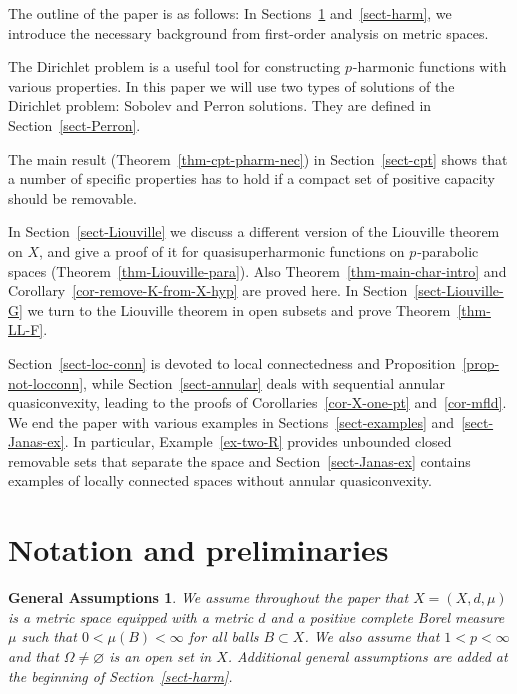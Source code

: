 \documentclass[a4paper,twoside]{article}
\theoremstyle{propositional}
\newtheorem*{ass}{General Assumptions}
\theoremstyle{descriptive}
\theoremstyle{remarkstyle}
\renewcommand{\emptyset}{\varnothing}
\newcommand{\Om}{\Omega}
\newcommand{\p}{{$p\mspace{1mu}$}}
\numberwithin{equation}{section}
\begin{document}
The outline of the paper is as follows:
In Sections~\ref{sect-ug} and~\ref{sect-harm},
we introduce the necessary background  from
first-order analysis on metric spaces.


The Dirichlet problem
is a useful tool for constructing \p-harmonic functions
with various properties.
In this paper we will use two types of solutions
of the Dirichlet problem: Sobolev and Perron solutions.
They are defined in Section~\ref{sect-Perron}.

The main result (Theorem~\ref{thm-cpt-pharm-nec}) in Section~\ref{sect-cpt}
shows that a number of specific properties has to hold if a compact
set of positive capacity should be removable. 

In Section~\ref{sect-Liouville} we discuss a different version
of the Liouville theorem on $X$, and give a proof
of it for quasisuperharmonic functions on \p-parabolic spaces 
(Theorem~\ref{thm-Liouville-para}).
Also Theorem~\ref{thm-main-char-intro} 
and Corollary~\ref{cor-remove-K-from-X-hyp} are proved here.
In Section~\ref{sect-Liouville-G} we turn to
the Liouville theorem in open subsets and prove Theorem~\ref{thm-LL-F}.

Section~\ref{sect-loc-conn} is devoted to 
local connectedness and 
Proposition~\ref{prop-not-locconn},
while Section~\ref{sect-annular} deals with
sequential annular quasiconvexity,
leading to the proofs of Corollaries~\ref{cor-X-one-pt} and~\ref{cor-mfld}.
We end the paper with various examples in Sections~\ref{sect-examples}
and~\ref{sect-Janas-ex}.
In particular,  Example~\ref{ex-two-R}
provides unbounded closed removable sets that separate the space
and Section~\ref{sect-Janas-ex} contains examples of locally connected spaces 
without annular quasiconvexity.





\section{Notation and preliminaries}
\label{sect-ug}

\begin{ass}
We assume throughout the paper
that $X=(X,d,\mu)$ is a metric space equipped
with a metric $d$ and a positive complete  Borel  measure $\mu$
such that $0<\mu(B)<\infty$ for all 
balls $B \subset X$.
We also assume that $1<p< \infty$
and that $\Om\ne\emptyset$ is an open set in $X$.
Additional general
assumptions are added at  the beginning of Section~\ref{sect-harm}.
\end{ass}
\end{document}
